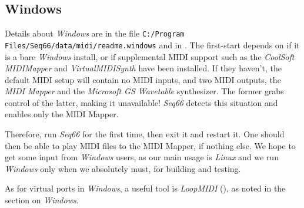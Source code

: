 \subsection{Windows}
\label{subsec:introduction_windows}


   Details about \textsl{Windows} are in the file
   \texttt{C:/Program Files/Seq66/data/midi/readme.windows}
   and in .
   The first-start depends on if it is a bare \textsl{Windows}
   install, or if supplemental MIDI support such as 
   the 
   \textsl{CoolSoft MIDIMapper} and 
   \textsl{VirtualMIDISynth} have been installed.
   If they haven't, the default MIDI setup will contain no MIDI inputs,
   and two MIDI outputs, the \textsl{MIDI Mapper} and the
   \textsl{Microsoft GS Wavetable} synthesizer.
   The former grabs control of the latter, making it unavailable!
   \textsl{Seq66} detects this situation and enables only the MIDI Mapper.

   Therefore, run \textsl{Seq66} for the first time, then exit it and
   restart it. One should then be able to play MIDI files to the MIDI Mapper,
   if nothing else.
   We hope to get some input from
   \textsl{Windows} users, as our main usage is \textsl{Linux}
   and we run \textsl{Windows} only when we absolutely must, for building
   and testing.

   As for virtual ports in \textsl{Windows}, a useful tool
   is \textsl{LoopMIDI} (\cite{loopmidi}), as noted in the section
   on \textsl{Windows}.

